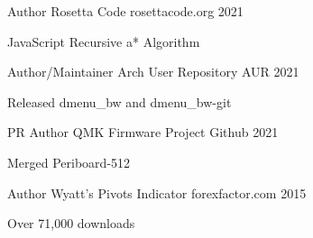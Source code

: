 

\begin{cventries}


  \cventry
    {Author} %
    {Rosetta Code} %
    {rosettacode.org} %
    {2021} %
    {
      \begin{cvitems} %
        \item {JavaScript Recursive a* Algorithm}
      \end{cvitems}
    }

  \cventry
    {Author/Maintainer} %
    {Arch User Repository} %
    {AUR} %
    {2021} %
    {
      \begin{cvitems} %
        \item {Released dmenu\_bw and dmenu\_bw-git}
      \end{cvitems}
    }

  \cventry
    {PR Author} %
    {QMK Firmware Project} %
    {Github} %
    {2021} %
    {
      \begin{cvitems} %
        \item {Merged Periboard-512}
      \end{cvitems}
    }

  \cventry
    {Author} %
    {Wyatt's Pivots Indicator} %
    {forexfactor.com} %
    {2015} %
    {
      \begin{cvitems} %
        \item {Over 71,000 downloads}
      \end{cvitems}
    }

\end{cventries}
